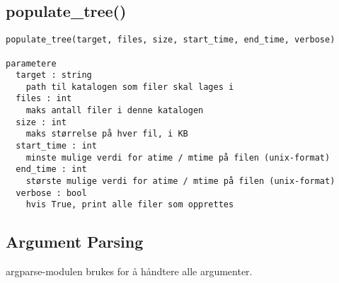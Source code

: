 \documentclass{article}
\begin{document}
\subsection{populate\_tree()}
\begin{Verbatim}
populate_tree(target, files, size, start_time, end_time, verbose)

parametere 
  target : string
    path til katalogen som filer skal lages i
  files : int
    maks antall filer i denne katalogen
  size : int
    maks størrelse på hver fil, i KB
  start_time : int
    minste mulige verdi for atime / mtime på filen (unix-format)
  end_time : int
    største mulige verdi for atime / mtime på filen (unix-format)
  verbose : bool
    hvis True, print alle filer som opprettes
\end{Verbatim}

\subsection{Argument Parsing}
argparse-modulen brukes for å håndtere alle argumenter.  
\end{document}
